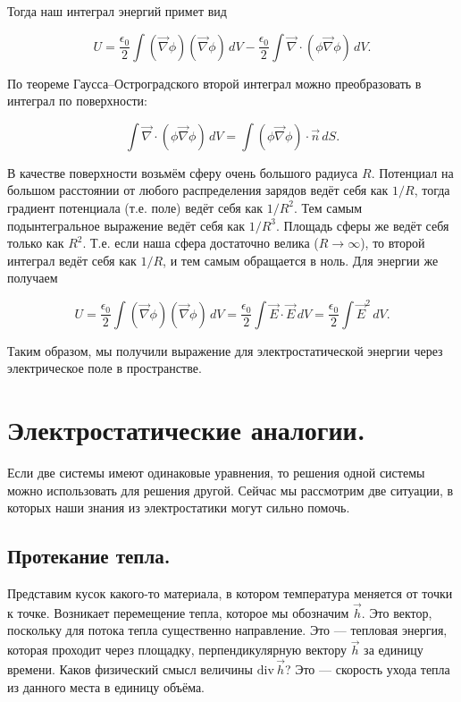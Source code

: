 \documentclass[12pt,a4paper]{article}
\numberwithin{equation}{section}
\numberwithin{equation}{section}
\renewcommand{\div}{\mathrm{div}\,}
\newcommand{\vn}{\vec{\nabla}}
\newcommand{\eps}{\epsilon}
\begin{document}
Тогда наш интеграл энергий примет вид

\begin{equation}
  \label{eq:energy_field_der_3}
  U = \frac{\eps_0}{2} \int (\vn \phi) (\vn \phi) \, dV -
  \frac{\eps_0}{2} \int \vn \cdot (\phi \vn \phi)\, dV.
\end{equation}

По теореме Гаусса--Остроградского второй интеграл можно преобразовать
в интеграл по поверхности: 

\begin{equation}
  \label{eq:energy_field_der_4}
   \int \vn \cdot (\phi \vn \phi)\, dV = \int (\phi \vn \phi) \cdot
   \vec{n}\, dS.
\end{equation}

В качестве поверхности возьмём сферу очень
большого радиуса $R$. Потенциал на большом расстоянии от любого
распределения зарядов ведёт себя как $1/R$, тогда градиент потенциала
(т.е. поле) ведёт себя как $1/R^2$. Тем самым подынтегральное
выражение ведёт себя как $1/R^3$. Площадь сферы же ведёт себя только
как $R^2$. Т.е. если наша сфера достаточно велика ($R \to \infty$), то
второй интеграл ведёт себя как $1/R$, и тем самым обращается в
ноль. Для энергии же получаем

\begin{equation}
  \label{eq:energy_field_der_5}
  U = \frac{\eps_0}{2} \int (\vn \phi) (\vn \phi) \, dV =
  \frac{\eps_0}{2} \int \vec{E} \cdot \vec{E} \, dV = \frac{\eps_0}{2}
  \int \vec{E}^2 \, dV.
\end{equation}

Таким образом, мы получили выражение для электростатической энергии
через электрическое поле в пространстве. 

\section{Электростатические аналогии. }
\label{sec:es_analogs}

Если две системы имеют одинаковые уравнения, то решения одной
системы можно использовать для решения другой. Сейчас мы рассмотрим
две ситуации, в которых наши знания из электростатики могут сильно
помочь. 

\subsection{Протекание тепла.}
\label{sec:heat}

Представим кусок какого-то материала, в котором температура меняется
от точки к точке. Возникает перемещение тепла, которое мы обозначим
$\vec{h}$. Это вектор, поскольку для потока тепла существенно
направление. Это --- тепловая энергия, которая проходит через
площадку, перпендикулярную вектору $\vec{h}$ за единицу времени. Каков
физический смысл величины $\div \vec{h}$? Это --- скорость ухода тепла
из данного места в единицу объёма. 
\end{document}
